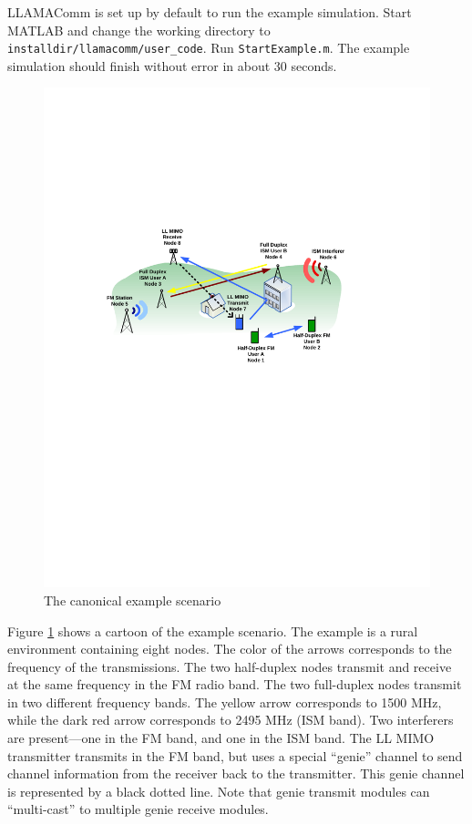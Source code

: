 LLAMAComm is set up by default to run the example simulation.  Start
MATLAB and change the working directory to
\verb+installdir/llamacomm/user_code+. Run \verb+StartExample.m+. The example
simulation should finish without error in about 30 seconds.

\begin{figure}[h]
\centering
\includegraphics[width=6in]{figs/Canonical_Scenario}
\caption{The canonical example scenario}
\label{fig:canonicalEx}
\end{figure}

Figure \ref{fig:canonicalEx} shows a cartoon of the example
scenario. The example is a rural environment containing eight nodes.
The color of the arrows corresponds to the frequency of the
transmissions.  The two half-duplex nodes transmit and receive at
the same frequency in the FM radio band.  The two full-duplex nodes
transmit in two different frequency bands.  The yellow arrow
corresponds to 1500 MHz, while the dark red arrow corresponds to
2495 MHz (ISM band). Two interferers are present---one in the FM
band, and one in the ISM band. The LL MIMO transmitter transmits in
the FM band, but uses a special ``genie'' channel to send channel
information from the receiver back to the transmitter.  This genie
channel is represented by a black dotted line.  Note that genie transmit modules can ``multi-cast'' to multiple genie receive modules.

